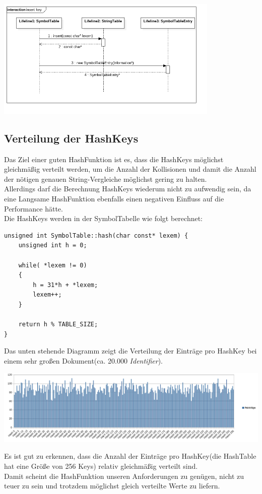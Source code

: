\documentclass[
    a4paper
]{scrreprt}
\begin{document}
    \begin{center}
    	\includegraphics[width=0.8\textwidth]{./images/symtable_seq.png}
    \end{center}    
    
    \subsection*{Verteilung der HashKeys}
    Das Ziel einer guten HashFunktion ist es, dass die HashKeys möglichst gleichmäßig verteilt werden, um die Anzahl der Kollisionen und damit die Anzahl der nötigen genauen String-Vergleiche möglichst gering zu halten.\\
    
	Allerdings darf die Berechnung HashKeys wiederum nicht zu aufwendig sein, da eine Langsame HashFunktion ebenfalls einen negativen Einfluss auf die Performance hätte.\\
	Die HashKeys werden in der SymbolTabelle wie folgt berechnet:\\
	\pagebreak
	\begin{lstlisting}
unsigned int SymbolTable::hash(char const* lexem) {
    unsigned int h = 0;
	
    while( *lexem != 0)
    {
        h = 31*h + *lexem;
        lexem++;
    }
	
    return h % TABLE_SIZE;
}
	\end{lstlisting}
	
    
	Das unten stehende Diagramm zeigt die Verteilung der Einträge pro HashKey bei einem sehr großen Dokument(ca. 20.000 \emph{Identifier}). 
    \begin{center}
    	\includegraphics[width=\textwidth]{./charts/hashtable_distribution.png}
    \end{center}
	Es ist gut zu erkennen, dass die Anzahl der Einträge pro HashKey(die HashTable hat eine Größe von 256 Keys) relativ gleichmäßig verteilt sind.\\
	Damit scheint die HashFunktion unseren Anforderungen zu genügen, nicht zu teuer zu sein und trotzdem möglichst gleich verteilte Werte zu liefern.
    
\end{document}
